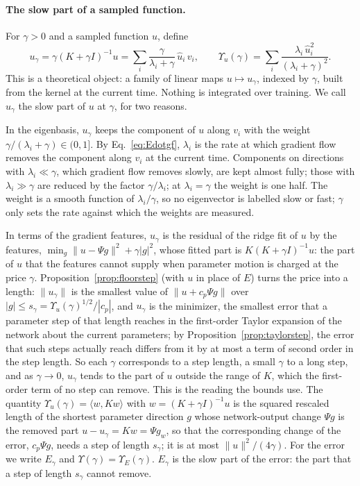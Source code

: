 \documentclass[11pt]{article}
\theoremstyle{definition}
\theoremstyle{remark}
\newcommand{\ip}[2]{\langle #1,#2\rangle}
\begin{document}
\paragraph{The slow part of a sampled function.}
For $\gamma > 0$ and a sampled function $u$, define
\begin{equation}\label{eq:ugamma}
u_\gamma = \gamma(K+\gamma I)^{-1}u = \sum_i \frac{\gamma}{\lambda_i+\gamma}\,\hat u_i\,v_i, \qquad \Upsilon_u(\gamma) = \sum_i\frac{\lambda_i\,\hat u_i^2}{(\lambda_i+\gamma)^2}.
\end{equation}
This is a theoretical object: a family of linear maps $u \mapsto u_\gamma$, indexed by $\gamma$, built from the kernel at the current time.
Nothing is integrated over training.
We call $u_\gamma$ the slow part of $u$ at $\gamma$, for two reasons.

In the eigenbasis, $u_\gamma$ keeps the component of $u$ along $v_i$ with the weight $\gamma/(\lambda_i+\gamma) \in (0,1]$.
By Eq.~\eqref{eq:Edotgf}, $\lambda_i$ is the rate at which gradient flow removes the component along $v_i$ at the current time.
Components on directions with $\lambda_i \ll \gamma$, which gradient flow removes slowly, are kept almost fully; those with $\lambda_i \gg \gamma$ are reduced by the factor $\gamma/\lambda_i$; at $\lambda_i = \gamma$ the weight is one half.
The weight is a smooth function of $\lambda_i/\gamma$, so no eigenvector is labelled slow or fast; $\gamma$ only sets the rate against which the weights are measured.

In terms of the gradient features, $u_\gamma$ is the residual of the ridge fit of $u$ by the features, $\min_g \|u - \Psi g\|^2 + \gamma|g|^2$, whose fitted part is $K(K+\gamma I)^{-1}u$: the part of $u$ that the features cannot supply when parameter motion is charged at the price $\gamma$.
Proposition~\ref{prop:floorstep} (with $u$ in place of $E$) turns the price into a length: $\|u_\gamma\|$ is the smallest value of $\|u + c_p\Psi g\|$ over $|g| \le s_\gamma = \Upsilon_u(\gamma)^{1/2}/|c_p|$, and $u_\gamma$ is the minimizer, the smallest error that a parameter step of that length reaches in the first-order Taylor expansion of the network about the current parameters; by Proposition~\ref{prop:taylorstep}, the error that such steps actually reach differs from it by at most a term of second order in the step length.
So each $\gamma$ corresponds to a step length, a small $\gamma$ to a long step, and as $\gamma \to 0$, $u_\gamma$ tends to the part of $u$ outside the range of $K$, which the first-order term of no step can remove.
This is the reading the bounds use.
The quantity $\Upsilon_u(\gamma) = \ip{w}{Kw}$ with $w = (K+\gamma I)^{-1}u$ is the squared rescaled length of the shortest parameter direction $g$ whose network-output change $\Psi g$ is the removed part $u - u_\gamma = Kw = \Psi g_w$, so that the corresponding change of the error, $c_p\Psi g$, needs a step of length $s_\gamma$; it is at most $\|u\|^2/(4\gamma)$.
For the error we write $E_\gamma$ and $\Upsilon(\gamma) = \Upsilon_E(\gamma)$.
$E_\gamma$ is the slow part of the error: the part that a step of length $s_\gamma$ cannot remove.
\end{document}
